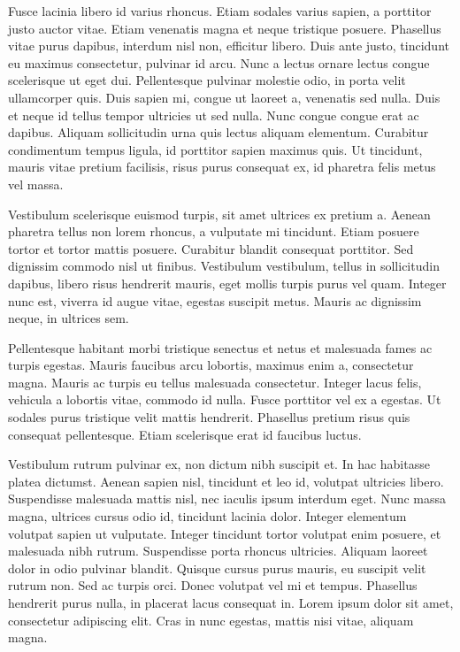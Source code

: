 Fusce lacinia libero id varius rhoncus. Etiam sodales varius sapien, a porttitor justo auctor vitae. Etiam venenatis magna et neque tristique posuere. Phasellus vitae purus dapibus, interdum nisl non, efficitur libero. Duis ante justo, tincidunt eu maximus consectetur, pulvinar id arcu. Nunc a lectus ornare lectus congue scelerisque ut eget dui. Pellentesque pulvinar molestie odio, in porta velit ullamcorper quis. Duis sapien mi, congue ut laoreet a, venenatis sed nulla. Duis et neque id tellus tempor ultricies ut sed nulla. Nunc congue congue erat ac dapibus. Aliquam sollicitudin urna quis lectus aliquam elementum. Curabitur condimentum tempus ligula, id porttitor sapien maximus quis. Ut tincidunt, mauris vitae pretium facilisis, risus purus consequat ex, id pharetra felis metus vel massa.

Vestibulum scelerisque euismod turpis, sit amet ultrices ex pretium a. Aenean pharetra tellus non lorem rhoncus, a vulputate mi tincidunt. Etiam posuere tortor et tortor mattis posuere. Curabitur blandit consequat porttitor. Sed dignissim commodo nisl ut finibus. Vestibulum vestibulum, tellus in sollicitudin dapibus, libero risus hendrerit mauris, eget mollis turpis purus vel quam. Integer nunc est, viverra id augue vitae, egestas suscipit metus. Mauris ac dignissim neque, in ultrices sem.

Pellentesque habitant morbi tristique senectus et netus et malesuada fames ac turpis egestas. Mauris faucibus arcu lobortis, maximus enim a, consectetur magna. Mauris ac turpis eu tellus malesuada consectetur. Integer lacus felis, vehicula a lobortis vitae, commodo id nulla. Fusce porttitor vel ex a egestas. Ut sodales purus tristique velit mattis hendrerit. Phasellus pretium risus quis consequat pellentesque. Etiam scelerisque erat id faucibus luctus.

Vestibulum rutrum pulvinar ex, non dictum nibh suscipit et. In hac habitasse platea dictumst. Aenean sapien nisl, tincidunt et leo id, volutpat ultricies libero. Suspendisse malesuada mattis nisl, nec iaculis ipsum interdum eget. Nunc massa magna, ultrices cursus odio id, tincidunt lacinia dolor. Integer elementum volutpat sapien ut vulputate. Integer tincidunt tortor volutpat enim posuere, et malesuada nibh rutrum. Suspendisse porta rhoncus ultricies. Aliquam laoreet dolor in odio pulvinar blandit. Quisque cursus purus mauris, eu suscipit velit rutrum non. Sed ac turpis orci. Donec volutpat vel mi et tempus. Phasellus hendrerit purus nulla, in placerat lacus consequat in. Lorem ipsum dolor sit amet, consectetur adipiscing elit. Cras in nunc egestas, mattis nisi vitae, aliquam magna.

